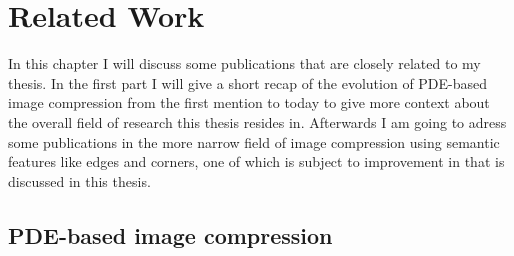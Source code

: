 \chapter{Related Work}\label{ch:RelatedWork}

In this chapter I will discuss some publications that are closely related to my thesis. 
In the first part I will give a short recap of the evolution of PDE-based image compression from
the first mention to today to
give more context about the overall field of research this thesis resides in.
Afterwards I am going to adress some publications in the more narrow field of image compression
using semantic features like edges and corners, one of which is subject to improvement in
that is discussed in this thesis.

\section{PDE-based image compression}

